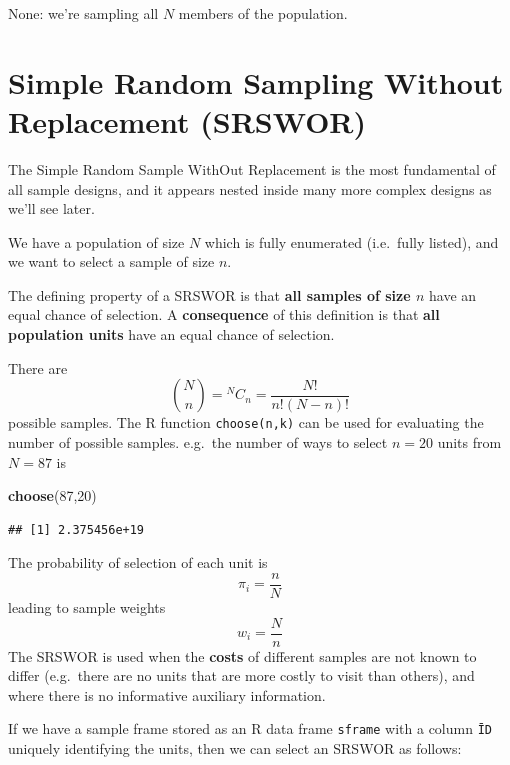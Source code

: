 \documentclass[
]{book}
\newenvironment{Shaded}{\begin{snugshade}}{\end{snugshade}}
\newcommand{\DecValTok}[1]{\textcolor[rgb]{0.00,0.00,0.81}{#1}}
\newcommand{\FunctionTok}[1]{\textcolor[rgb]{0.13,0.29,0.53}{\textbf{#1}}}
\newcommand{\NormalTok}[1]{#1}
\newcommand{\OtherTok}[1]{\textcolor[rgb]{0.56,0.35,0.01}{#1}}
\newcommand{\SpecialCharTok}[1]{\textcolor[rgb]{0.81,0.36,0.00}{\textbf{#1}}}
\begin{document}
None: we're sampling all \(N\) members of the population.

\section{Simple Random Sampling Without Replacement (SRSWOR)}\label{simple-random-sampling-without-replacement-srswor}

The Simple Random Sample WithOut Replacement is the most fundamental of all
sample designs, and it appears nested inside many more complex designs as we'll see later.

We have a population of size \(N\) which is fully enumerated (i.e.~fully listed), and
we want to select a sample of size \(n\).

The defining property of a SRSWOR is that \textbf{all samples of size \(n\)} have an equal chance
of selection. A \textbf{consequence} of this definition is that \textbf{all population units} have
an equal chance of selection.

There are
\[
   \binom{N}{n} = {}^NC_n = \frac{N!}{n!(N-n)!} 
\]
possible samples. The R function \texttt{choose(n,k)} can be used for evaluating the number
of possible samples. e.g.~the number of ways to select \(n=20\) units from \(N=87\) is

\begin{Shaded}
\begin{Highlighting}[]
\FunctionTok{choose}\NormalTok{(}\DecValTok{87}\NormalTok{,}\DecValTok{20}\NormalTok{)}
\end{Highlighting}
\end{Shaded}

\begin{verbatim}
## [1] 2.375456e+19
\end{verbatim}

The probability of selection of each unit is
\[
   \pi_i = \frac{n}{N}
\]
leading to sample weights
\[
   w_i = \frac{N}{n}
\]
The SRSWOR is used when the \textbf{costs} of different samples are not known to differ
(e.g.~there are no units that are more costly to visit than others), and where
there is no informative auxiliary information.

If we have a sample frame stored as an R data frame \texttt{sframe} with a column \texttt{ĪD} uniquely
identifying the units, then we can select an SRSWOR as follows:

\begin{Shaded}
\end{Shaded}
\end{document}
